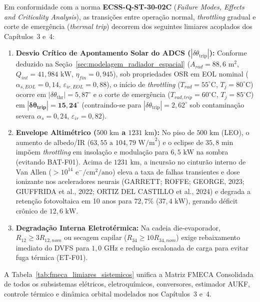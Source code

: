 Em conformidade com a norma \textbf{ECSS-Q-ST-30-02C} (\textit{Failure Modes, Effects and Criticality Analysis}), as transições entre operação normal, \textit{throttling} gradual e corte de emergência (\textit{thermal trip}) decorrem dos seguintes limiares acoplados dos Capítulos~3 e~4:
\begin{enumerate}[label=(\alph*),leftmargin=*]
    \item \textbf{Desvio Crítico de Apontamento Solar do ADCS ($|\delta\theta_{\text{trip}}|$):} Conforme deduzido na Seção~\ref{sec:modelagem_radiador_espacial} ($A_{rad} = 88{,}6\text{ m}^2$, $Q_{int} = 41{,}984\text{ kW}$, $\eta_{fin} = 0{,}945$), sob propriedades OSR em EOL nominal ($\alpha_{s,EOL} = 0{,}14$, $\varepsilon_{ir,EOL} = 0{,}88$), o início de \textit{throttling} ($T_{rad} = 55^\circ\text{C}$, $T_j = 80^\circ\text{C}$) ocorre em $|\delta\theta_{\text{thr}}| = 5{,}87^\circ$ e o corte de emergência ($T_{rad,trip} = 60^\circ\text{C}$, $T_j = 85^\circ\text{C}$) em $\mathbf{|\delta\theta_{\text{trip}}| = 15{,}24^\circ}$ (contraindo-se para $|\delta\theta_{\text{trip}}| = 2{,}62^\circ$ sob contaminação severa $\alpha_s = 0{,}24$, $\varepsilon_{ir} = 0{,}82$).
    \item \textbf{Envelope Altimétrico ($500\text{ km}$ a $1231\text{ km}$):} No piso de $500\text{ km}$ (LEO), o aumento de albedo/IR ($63{,}55\text{ a }104{,}79\text{ W/m}^2$) e o eclipse de $35{,}8\text{ min}$ impõem \textit{throttling} em insolação e modulação para $6{,}5\text{ kW}$ na sombra (evitando BAT-F01). Acima de $1231\text{ km}$, a incursão no cinturão interno de Van Allen ($> 10^{14}\text{ e}^-/\text{cm}^2/\text{ano}$) eleva a taxa de falhas transientes e dose ionizante nos aceleradores neurais (GARRETT; ROFFE; GEORGE, 2023; GIUFFRIDA et al., 2022; ORTIZ DEL CASTILLO et al., 2024) e degrada a retenção fotovoltaica em 10 anos para $72{,}7\%$ ($37{,}4\text{ kW}$), gerando déficit crônico de $12{,}6\text{ kW}$.
    \item \textbf{Degradação Interna Eletrotérmica:} Na cadeia die-evaporador, $R_{12} \ge 3 R_{12,nom}$ ou secagem capilar ($R_{34} \ge 10 R_{34,nom}$) exige rebaixamento imediato do DVFS para $1{,}0\text{ GHz}$ e redução escalonada de carga para evitar fuga térmica (ET-F01).
\end{enumerate}

A Tabela~\ref{tab:fmeca_limiares_sistemicos} unifica a Matriz FMECA Consolidada de todos os subsistemas elétricos, eletroquímicos, conversores, estimador AUKF, controle térmico e dinâmica orbital modelados nos Capítulos~3 e~4.

